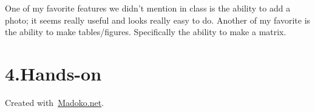 \documentclass[11pt]{article}
\begin{document}
\noindent{}One of my favorite features we didn't mention in class is the ability to add a photo; it seems really useful and looks really easy to do.
Another of my favorite is the ability to make tables/figures. Specifically the ability to make a matrix.%

\section{4.\hspace*{0.5em}Hands-on}\label{sec-hands-on}%

\begin{mdbmargintb}{4em}{}%
\begin{mdflushright}%
{\tiny{}Created with~\href{https://www.madoko.net}{Madoko.net}.}%
\end{mdflushright}%
\end{mdbmargintb}%
\end{document}
